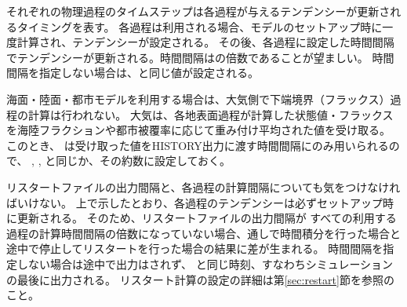 それぞれの物理過程のタイムステップは各過程が与えるテンデンシーが更新されるタイミングを表す。
各過程は利用される場合、モデルのセットアップ時に一度計算され、テンデンシーが設定される。
その後、各過程に設定した時間間隔でテンデンシーが更新される。時間間隔はの倍数であることが望ましい。
時間間隔を指定しない場合は、と同じ値が設定される。


海面・陸面・都市モデルを利用する場合は、大気側で下端境界（フラックス）過程の計算は行われない。
大気は、各地表面過程が計算した状態値・フラックスを海陸フラクションや都市被覆率に応じて重み付け平均された値を受け取る。
このとき、 は受け取った値をHISTORY出力に渡す時間間隔にのみ用いられるので、
, ,  と同じか、その約数に設定しておく。

リスタートファイルの出力間隔と、各過程の計算間隔についても気をつけなければいけない。
上で示したとおり、各過程のテンデンシーは必ずセットアップ時に更新される。
そのため、リスタートファイルの出力間隔が
すべての利用する過程の計算時間間隔の倍数になっていない場合、通しで時間積分を行った場合と
途中で停止してリスタートを行った場合の結果に差が生まれる。
時間間隔を指定しない場合は途中で出力はされず、
と同じ時刻、すなわちシミュレーションの最後に出力される。
リスタート計算の設定の詳細は第\ref{sec:restart}節を参照のこと。

